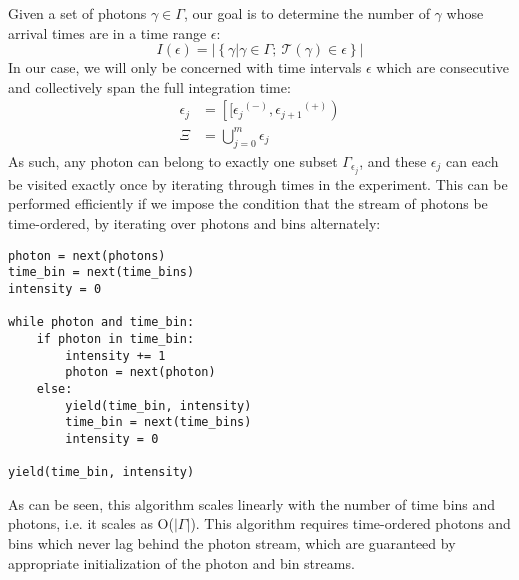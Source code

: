 \documentclass{article}
\newcommand{\braces}[1]{\ensuremath{\left\lbrace #1 \right\rbrace}}
\newcommand{\setbuilder}[2]{\ensuremath{\braces{#1 \left| #2 \right.}}}
\newcommand{\abs}[1]{\ensuremath{\left|#1\right|}}
\newcommand{\Time}{\ensuremath{\mathcal{T}}}
\newcommand{\photon}{\ensuremath{\gamma}}
\newcommand{\photons}{\ensuremath{\Gamma}}
\newcommand{\integrationtime}{\ensuremath{\Xi}}
\newcommand{\resolution}{\ensuremath{\epsilon}}
\newcommand{\upplus}{\ensuremath{^{(+)}}}
\newcommand{\upminus}{\ensuremath{^{(-)}}}
\begin{document}
Given a set of photons $\photon\in\photons$, our goal is to determine the number of $\photon$ whose arrival times are in a time range $\epsilon$:
\begin{equation}
I(\resolution) = \abs{\setbuilder{\photon}{\photon\in\photons;~\Time(\photon)\in\epsilon}}
\end{equation}
In our case, we will only be concerned with time intervals $\resolution$ which are consecutive and collectively span the full integration time:
\begin{align}
\resolution_{j} &= \left[[\resolution_{j}\upminus,\resolution_{j+1}\upplus\right) \\
\integrationtime &= \bigcup\limits_{j=0}^{m}{\resolution_{j}}
\end{align}
As such, any photon can belong to exactly one subset $\photons_{\resolution_{j}}$, and these $\resolution_{j}$ can each be visited exactly once by iterating through times in the experiment. This can be performed efficiently if we impose the condition that the stream of photons be time-ordered, by iterating over photons and bins alternately:
\lstset{language=Python}
\begin{lstlisting}
photon = next(photons)
time_bin = next(time_bins)
intensity = 0

while photon and time_bin:
    if photon in time_bin:
        intensity += 1
        photon = next(photon)
    else:
        yield(time_bin, intensity)
        time_bin = next(time_bins)
        intensity = 0

yield(time_bin, intensity)
\end{lstlisting}
As can be seen, this algorithm scales linearly with the number of time bins and photons, i.e. it scales as O(\abs{\photons}). This algorithm requires time-ordered photons and bins which never lag behind the photon stream, which are guaranteed by appropriate initialization of the photon and bin streams.
\end{document}
